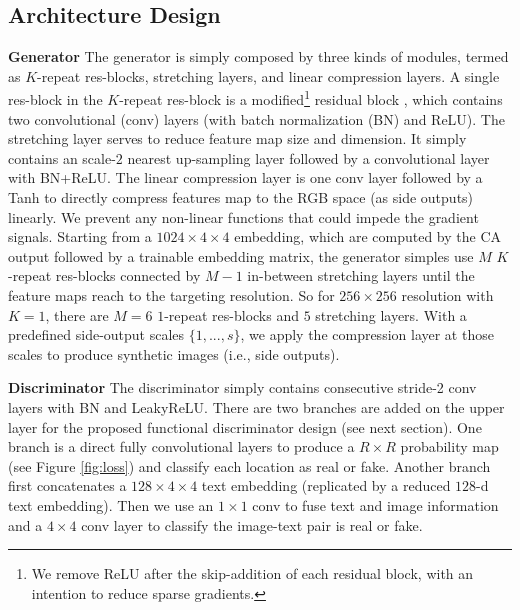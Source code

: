 \documentclass[10pt,twocolumn,letterpaper]{article}
\begin{document}
\subsection{Architecture Design}

\textbf{Generator} The generator is simply composed by three kinds of modules, termed as $K$-repeat res-blocks, stretching layers, and linear compression layers.
A single res-block in the $K$-repeat res-block is a modified\footnote{We remove ReLU after the skip-addition of each residual block, with an intention to reduce sparse gradients.} residual block \cite{he2016identity}, which contains two convolutional (conv) layers (with batch normalization (BN) \cite{ioffe2015batch} and ReLU). The stretching layer serves to reduce feature map size and dimension. It simply contains an scale-$2$ nearest up-sampling layer followed by a convolutional layer with BN+ReLU. The linear compression layer is one conv layer followed by a Tanh to directly compress features map to the RGB space (as side outputs) linearly. We prevent any non-linear functions that could impede the gradient signals. 
Starting from a $1024{\times}4{\times}4$ embedding, which are computed by the CA output followed by a trainable embedding matrix, the generator simples use $M$ $K$-repeat res-blocks connected by $M{-}1$ in-between stretching layers until the feature maps reach to the targeting resolution. 
So for $256{\times}256$ resolution with $K{=}1$, there are $M{=}6$ $1$-repeat res-blocks and $5$ stretching layers. 
With a predefined side-output scales $\{1,...,s\}$, we apply the compression layer at those scales to produce synthetic images (i.e., side outputs). 

\textbf{Discriminator} The discriminator simply contains consecutive stride-2 conv layers with BN and LeakyReLU. There are two branches are added on the upper layer for the proposed functional discriminator design (see next section). One branch is a direct fully convolutional layers to produce a $R{\times}R$ probability map (see Figure \ref{fig:loss}) and classify each location as real or fake. 
Another branch first concatenates a $128{\times}4{\times}4$ text embedding (replicated by a reduced $128$-d text embedding). Then we use an $1{\times}1$ conv to fuse text and image information and  a $4{\times}4$ conv layer to classify the image-text pair is real or fake.
\end{document}
